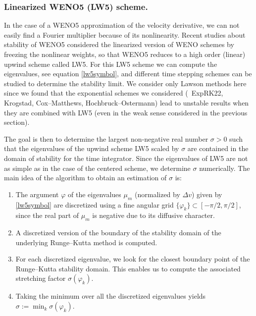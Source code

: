 \subsubsection{Linearized WENO5 (LW5) scheme. }

In the case of a WENO5 approximation of the velocity derivative, we can not 
easily find a Fourier multiplier because of its nonlinearity. 
Recent studies about stability of WENO5 \cite{wang, motamed, lunet} considered 
the linearized version of WENO schemes by freezing the nonlinear weights, 
so that WENO5 reduces to a high order (linear) upwind scheme called LW5. For this LW5 scheme we can
compute the eigenvalues, see equation \eqref{lw5symbol}, 
and different time stepping schemes can be studied to determine the stability limit. 
We consider only Lawson methods here since we found 
that the exponential schemes we considered (\ie{}~ExpRK22, Krogstad, Cox--Matthews, Hochbruck--Ostermann) 
lead to unstable results when they are combined with LW5 (even in the weak sense considered in the previous section).

The goal  is then to determine the largest non-negative real number $\sigma>0$ such that the 
eigenvalues of the upwind scheme LW5 scaled by $\sigma$ are contained in the domain of stability for the 
time integrator. Since the eigenvalues of LW5 are not as simple as in the case of the centered scheme, we determine $\sigma$ numerically. The main idea of the algorithm to obtain an estimation of $\sigma$ is:
\begin{enumerate}
    \item The argument $\varphi$ of the eigenvalues $\mu_m$  (normalized by $\Delta v$) given by \eqref{lw5symbol} are discretized using a fine angular grid $\{ \varphi_k\} \subset [-\pi/2, \pi/2]$, since the real part of $\mu_{m}$ is negative due to its diffusive character.
  \item A discretized version of the boundary of the stability domain of the underlying Runge--Kutta method is computed.
  \item For each discretized eigenvalue, we look for the closest boundary point of the Runge--Kutta stability domain. 
  This enables us to compute the associated stretching factor $\sigma(\varphi_k)$.
  \item Taking the minimum over all the discretized eigenvalues yields $\sigma:=\min_{k} \sigma(\varphi_k)$. 
\end{enumerate}




